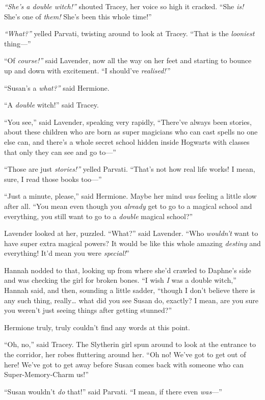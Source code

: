 \emph{``She's a double witch!''} shouted Tracey, her voice so high it
cracked. ``She \emph{is!} She's one of \emph{them!} She's been this
whole time!''

\emph{``What?''} yelled Parvati, twisting around to look at Tracey.
``That is the \emph{looniest} thing---''

``Of \emph{course!''} said Lavender, now all the way on her feet and
starting to bounce up and down with excitement. ``I should've
\emph{realised!} ''

``Susan's a \emph{what?''} said Hermione.

``A \emph{double} witch!'' said Tracey.

``You see,'' said Lavender, speaking very rapidly, ``There've always
been stories, about these children who are born as super magicians who
can cast spells no one else can, and there's a whole secret school
hidden inside Hogwarts with classes that only they can see and go
to---''

``Those are just \emph{stories!''} yelled Parvati. ``That's not how real
life works! I mean, sure, I read those books too---''

``Just a minute, please,'' said Hermione. Maybe her mind \emph{was}
feeling a little slow after all. ``You mean even though you
\emph{already} get to go to a magical school and everything, you still
want to go to a \emph{double} magical school?''

Lavender looked at her, puzzled. ``What?'' said Lavender. ``Who
\emph{wouldn't} want to have super extra magical powers? It would be
like this whole amazing \emph{destiny} and everything! It'd mean you
were \emph{special!}''

Hannah nodded to that, looking up from where she'd crawled to Daphne's
side and was checking the girl for broken bones. ``I wish \emph{I} was a
double witch,'' Hannah said, and then, sounding a little sadder,
``though I don't believe there is any such thing, really\ldots{} what
did you see Susan do, exactly? I mean, are you sure you weren't just
seeing things after getting stunned?''

Hermione truly, truly couldn't find any words at this point.

``Oh, no,'' said Tracey. The Slytherin girl spun around to look at the
entrance to the corridor, her robes fluttering around her. ``Oh no!
We've got to get out of here! We've got to get away before Susan comes
back with someone who can Super-Memory-Charm us!''

``Susan wouldn't \emph{do} that!'' said Parvati. ``I mean, if there even
\emph{was}---''

